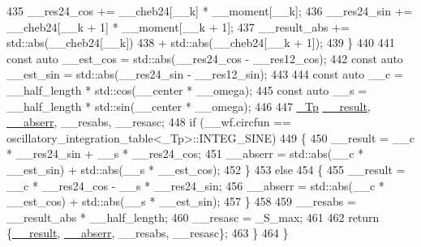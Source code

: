\begin{DoxyCode}
435               \_\_res24\_cos += \_\_cheb24[\_\_k] * \_\_moment[\_\_k];
436               \_\_res24\_sin += \_\_cheb24[\_\_k + 1] * \_\_moment[\_\_k + 1];
437               \_\_result\_abs += std::abs(\_\_cheb24[\_\_k])
438                             + std::abs(\_\_cheb24[\_\_k + 1]);
439             \}
440 
441           \textcolor{keyword}{const} \textcolor{keyword}{auto} \_\_est\_cos = std::abs(\_\_res24\_cos - \_\_res12\_cos);
442           \textcolor{keyword}{const} \textcolor{keyword}{auto} \_\_est\_sin = std::abs(\_\_res24\_sin - \_\_res12\_sin);
443 
444           \textcolor{keyword}{const} \textcolor{keyword}{auto} \_\_c = \_\_half\_length * std::cos(\_\_center * \_\_omega);
445           \textcolor{keyword}{const} \textcolor{keyword}{auto} \_\_s = \_\_half\_length * std::sin(\_\_center * \_\_omega);
446 
447           \hyperlink{namespace____gnu__cxx_a3b19a9c800ca194374ef9172290f7d79}{\_Tp} \hyperlink{namespace____gnu__cxx_a500ea9f53aeaecd8c2ae657503450578}{\_\_result}, \hyperlink{namespace____gnu__cxx_a72f736cff127f1574e91a301de9e074b}{\_\_abserr}, \_\_resabs, \_\_resasc;
448           \textcolor{keywordflow}{if} (\_\_wf.circfun == oscillatory\_integration\_table<\_Tp>::INTEG\_SINE)
449             \{
450               \_\_result = \_\_c * \_\_res24\_sin + \_\_s * \_\_res24\_cos;
451               \_\_abserr = std::abs(\_\_c * \_\_est\_sin) + std::abs(\_\_s * \_\_est\_cos);
452             \}
453           \textcolor{keywordflow}{else}
454             \{
455               \_\_result = \_\_c * \_\_res24\_cos - \_\_s * \_\_res24\_sin;
456               \_\_abserr = std::abs(\_\_c * \_\_est\_cos) + std::abs(\_\_s * \_\_est\_sin);
457             \}
458 
459           \_\_resabs = \_\_result\_abs * \_\_half\_length;
460           \_\_resasc = \_S\_max;
461 
462           \textcolor{keywordflow}{return} \{\hyperlink{namespace____gnu__cxx_a500ea9f53aeaecd8c2ae657503450578}{\_\_result}, \hyperlink{namespace____gnu__cxx_a72f736cff127f1574e91a301de9e074b}{\_\_abserr}, \_\_resabs, \_\_resasc\};
463         \}
464     \}
\end{DoxyCode}
\mbox{\label{namespace____gnu__cxx_a5659189e193b420e201b6769d65289b9}} 
